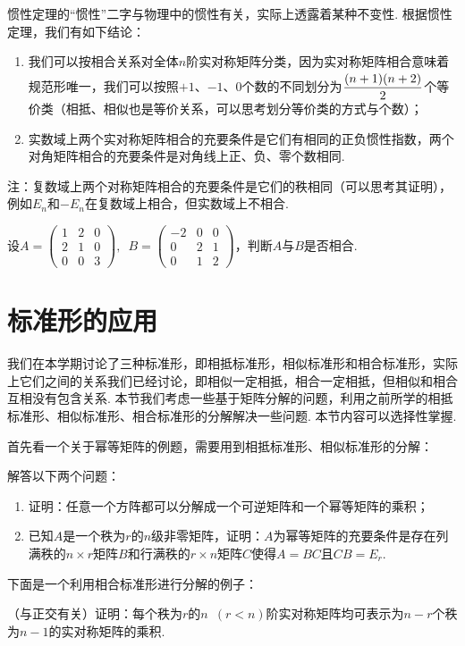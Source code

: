 惯性定理的``惯性''二字与物理中的惯性有关，实际上透露着某种不变性. 根据惯性定理，我们有如下结论：
\begin{enumerate}
    \item 我们可以按相合关系对全体$n$阶实对称矩阵分类，因为实对称矩阵相合意味着规范形唯一，我们可以按照$+1$、$-1$、0个数的不同划分为$\vphantom{\cfrac{n+1}{2}}\dfrac{(n+1)(n+2)}{2}$个等价类（相抵、相似也是等价关系，可以思考划分等价类的方式与个数）；

    \item 实数域上两个实对称矩阵相合的充要条件是它们有相同的正负惯性指数，两个对角矩阵相合的充要条件是对角线上正、负、零个数相同.
\end{enumerate}
注：复数域上两个对称矩阵相合的充要条件是它们的秩相同（可以思考其证明），例如$E_n$和$-E_n$在复数域上相合，但实数域上不相合.
\begin{example}
    设$A=\begin{pmatrix}
            1 & 2 & 0 \\ 2 & 1 & 0 \\ 0 & 0 & 3
        \end{pmatrix},\enspace B=\begin{pmatrix}
            -2 & 0 & 0 \\ 0 & 2 & 1 \\ 0 & 1 & 2
        \end{pmatrix}$，判断$A$与$B$是否相合.
\end{example}

\section{标准形的应用}

我们在本学期讨论了三种标准形，即相抵标准形，相似标准形和相合标准形，实际上它们之间的关系我们已经讨论，即相似一定相抵，相合一定相抵，但相似和相合互相没有包含关系. 本节我们考虑一些基于矩阵分解的问题，利用之前所学的相抵标准形、相似标准形、相合标准形的分解解决一些问题. 本节内容可以选择性掌握.

首先看一个关于幂等矩阵的例题，需要用到相抵标准形、相似标准形的分解：
\begin{example}
    解答以下两个问题：
    \begin{enumerate}
        \item 证明：任意一个方阵都可以分解成一个可逆矩阵和一个幂等矩阵的乘积；

        \item 已知$A$是一个秩为$r$的$n$级非零矩阵，证明：$A$为幂等矩阵的充要条件是存在列满秩的$n\times r$矩阵$B$和行满秩的$r\times n$矩阵$C$使得$A=BC$且$CB=E_r$.
    \end{enumerate}
\end{example}
下面是一个利用相合标准形进行分解的例子：
\begin{example}
    （与正交有关）证明：每个秩为$r$的$n\enspace(r<n)$阶实对称矩阵均可表示为$n-r$个秩为$n-1$的实对称矩阵的乘积.
\end{example}

